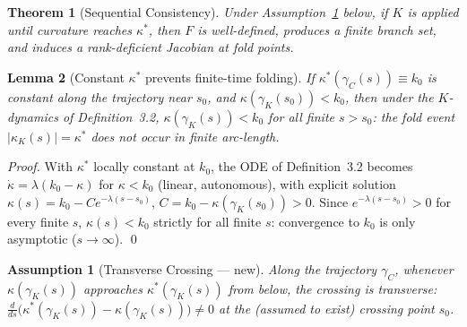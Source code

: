 \documentclass[14pt,a4paper]{extarticle}
\newtheorem{theorem}{Theorem}[section]
\newtheorem{lemma}[theorem]{Lemma}
\newtheorem{assumption}{Assumption}[section]
\begin{document}
\begin{theorem}[Sequential Consistency]
\label{thm:consistency}
Under Assumption~\ref{ass:transverse-crossing} below, if $K$ is applied
until curvature reaches $\kappa^*$, then $F$ is well-defined, produces a
finite branch set, and induces a rank-deficient Jacobian at fold points.
\end{theorem}

\begin{lemma}[Constant $\kappa^*$ prevents finite-time folding]
\label{lem:noconstant-v1}
If $\kappa^*(\gamma_C(s)) \equiv k_0$ is constant along the trajectory
near $s_0$, and $\kappa(\gamma_K(s_0)) < k_0$, then under the
$K$-dynamics of Definition~3.2, $\kappa(\gamma_K(s)) < k_0$ for
all finite $s>s_0$: the fold event $|\kappa_K(s)|=\kappa^*$ does not
occur in finite arc-length.
\end{lemma}

\begin{proof}
With $\kappa^*$ locally constant at $k_0$, the ODE of
Definition~3.2 becomes $\dot\kappa = \lambda(k_0-\kappa)$ for
$\kappa<k_0$ (linear, autonomous), with explicit solution $\kappa(s) =
k_0 - Ce^{-\lambda(s-s_0)}$, $C=k_0-\kappa(\gamma_K(s_0))>0$. Since
$e^{-\lambda(s-s_0)}>0$ for every finite $s$, $\kappa(s)<k_0$ strictly
for all finite $s$: convergence to $k_0$ is only asymptotic
($s\to\infty$).
\qed
\end{proof}

\begin{assumption}[Transverse Crossing --- new]
\label{ass:transverse-crossing}
Along the trajectory $\gamma_C$, whenever $\kappa(\gamma_K(s))$
approaches $\kappa^*(\gamma_K(s))$ from below, the crossing is
transverse: $\frac{d}{ds}\bigl(\kappa^*(\gamma_K(s)) -
\kappa(\gamma_K(s))\bigr) \neq 0$ at the (assumed to exist) crossing
point $s_0$.
\end{assumption}
\end{document}
